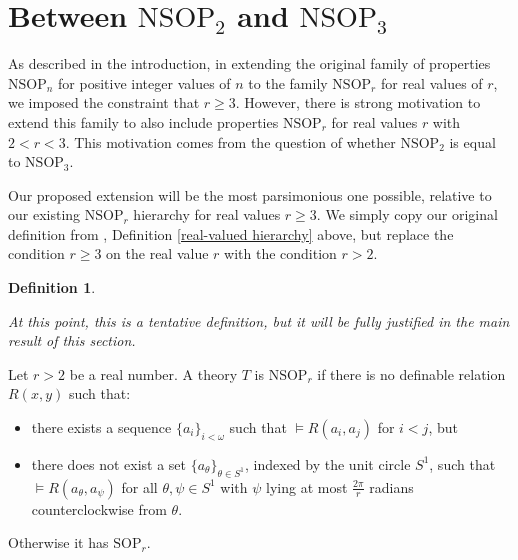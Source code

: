 \documentclass{amsart}
\theoremstyle{definition}
\newtheorem{definition}[theorem]{Definition}
\theoremstyle{remark}
\numberwithin{equation}{section}
\begin{document}
    



\section{Between $\mathrm{NSOP}_{2}$ and $\mathrm{NSOP}_{3}$}\label{between nsop2 and nsop3}

As described in the introduction, in extending the original family of properties $\mathrm{NSOP}_{n}$ for positive integer values of $n$ to the family $\mathrm{NSOP}_{r}$ for real values of $r$, we imposed the constraint that $r \geq 3$. However, there is strong motivation to extend this family to also include properties  $\mathrm{NSOP}_{r}$ for real values $r$ with $2 < r < 3$. This motivation comes from the question of whether $\mathrm{NSOP}_{2}$ is equal to $\mathrm{NSOP}_{3}$. 

Our proposed extension will be the most parsimonious one possible, relative to our existing $\mathrm{NSOP}_{r}$ hierarchy for real values $r \geq 3$. We simply copy our original definition from \cite{ApproxOrder}, Definition \ref{real-valued hierarchy} above, but replace the condition $r \geq 3$ on the real value $r$ with the condition $r > 2$.

\begin{definition}\label{real-valued hierarchy, r > 2}

\textit{At this point, this is a tentative definition, but it will be fully justified in the main result of this section.}


Let $r > 2$ be a real number. A theory $T$ is $\mathrm{NSOP}_{r}$ if there is no definable relation $R(x, y)$ such that:

\begin{itemize}
    \item there exists a sequence $\{a_{i}\}_{i < \omega}$ such that $\models R(a_{i}, a_{j})$ for $i <j$, but

    \item there does not exist a set $\{a_{\theta}\}_{\theta \in S^{1}}$, indexed by the unit circle $S^{1}$, such that $\models R(a_{\theta}, a_{\psi})$ for all $\theta, \psi \in S^{1}$ with $\psi$ lying at most $\frac{2\pi}{r}$ radians counterclockwise from $\theta$.
\end{itemize}



 Otherwise it has $\mathrm{SOP}_{r}$.
    
\end{definition}
\end{document}
